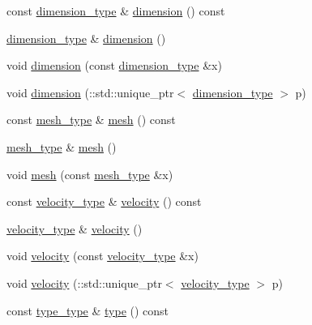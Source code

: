 \begin{DoxyCompactItemize}
const \hyperlink{classmembrane__t_afdd0310501689ebab285ec39821c5b76}{dimension\+\_\+type} \& \hyperlink{classmembrane__t_a7e32345fb2d04840937a5943ac7a7070}{dimension} () const 
\item 
\hyperlink{classmembrane__t_afdd0310501689ebab285ec39821c5b76}{dimension\+\_\+type} \& \hyperlink{classmembrane__t_a279eb1c9154bcfa88346391dee4d2cc8}{dimension} ()
\item 
void \hyperlink{classmembrane__t_aac3e97b8eab6473296ad03b6ee871e9a}{dimension} (const \hyperlink{classmembrane__t_afdd0310501689ebab285ec39821c5b76}{dimension\+\_\+type} \&x)
\item 
void \hyperlink{classmembrane__t_a63a682a09f95a84f2e068c77e031b190}{dimension} (\+::std\+::unique\+\_\+ptr$<$ \hyperlink{classmembrane__t_afdd0310501689ebab285ec39821c5b76}{dimension\+\_\+type} $>$ p)
\item 
const \hyperlink{classmembrane__t_a259dfb54e3d4a66cdd72b5b0831f4188}{mesh\+\_\+type} \& \hyperlink{classmembrane__t_afdf7f5ae5b5b1057e7c0cda79b33fbde}{mesh} () const 
\item 
\hyperlink{classmembrane__t_a259dfb54e3d4a66cdd72b5b0831f4188}{mesh\+\_\+type} \& \hyperlink{classmembrane__t_a9f1158a643e80ed0e813bd480fc8036a}{mesh} ()
\item 
void \hyperlink{classmembrane__t_a3e9a65ce4a1891a7e3abd889f9b812be}{mesh} (const \hyperlink{classmembrane__t_a259dfb54e3d4a66cdd72b5b0831f4188}{mesh\+\_\+type} \&x)
\item 
const \hyperlink{classmembrane__t_a41bad26c4626a8ceac158b3817306c62}{velocity\+\_\+type} \& \hyperlink{classmembrane__t_a304ff6c1a44d26042b5920b9db085c38}{velocity} () const 
\item 
\hyperlink{classmembrane__t_a41bad26c4626a8ceac158b3817306c62}{velocity\+\_\+type} \& \hyperlink{classmembrane__t_a3699033c38dadaccfa27d0e2eec4e7c5}{velocity} ()
\item 
void \hyperlink{classmembrane__t_a793c74f8dfc98659f4a470320b745825}{velocity} (const \hyperlink{classmembrane__t_a41bad26c4626a8ceac158b3817306c62}{velocity\+\_\+type} \&x)
\item 
void \hyperlink{classmembrane__t_afae91c26c573ff1d2b5990ff58e461c7}{velocity} (\+::std\+::unique\+\_\+ptr$<$ \hyperlink{classmembrane__t_a41bad26c4626a8ceac158b3817306c62}{velocity\+\_\+type} $>$ p)
\item 
const \hyperlink{classmembrane__t_a13eb0ee51a5a6018151503690e28e2fb}{type\+\_\+type} \& \hyperlink{classmembrane__t_a18d695a7e6ec11e6e8ce2d3d3802a8bf}{type} () const 
\item 

\end{DoxyCompactItemize}
